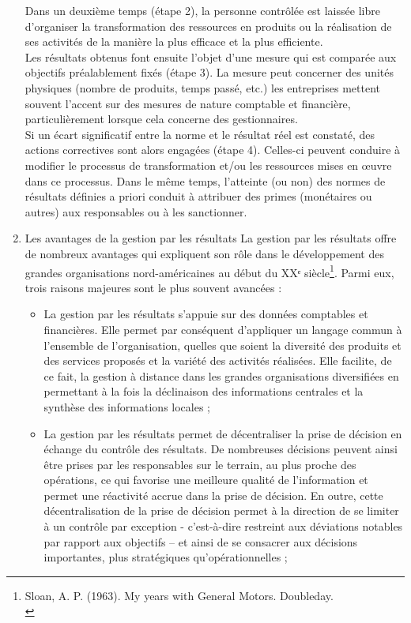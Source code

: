 \documentclass{tufte-handout}
\begin{document}
\begin{enumerate}
 Dans un deuxième temps (étape 2), la personne contrôlée est laissée libre d’organiser la transformation des ressources en produits ou la réalisation de ses activités de la manière la plus efficace et la plus efficiente.\\
Les résultats obtenus font ensuite l’objet d’une mesure qui est comparée aux objectifs préalablement fixés (étape 3). La mesure peut concerner des unités physiques (nombre de produits, temps passé, etc.) les entreprises mettent souvent l’accent sur des mesures de nature comptable et financière, particulièrement lorsque cela concerne des gestionnaires.\\
Si un écart significatif entre la norme et le résultat réel est constaté, des actions correctives sont alors engagées (étape 4). Celles-ci peuvent conduire à modifier le processus de transformation et/ou les ressources mises en œuvre dans ce processus. Dans le même temps, l’atteinte (ou non) des normes de résultats définies a priori conduit à attribuer des primes (monétaires ou autres) aux responsables ou à les sanctionner.\\
\item Les avantages de la gestion par les résultats
\label{sec:orgd37593c}
La gestion par les résultats offre de nombreux avantages qui expliquent son rôle dans le développement des grandes organisations nord-américaines au début du XXᵉ siècle\footnote{Sloan, A. P. (1963). My years with General Motors. Doubleday.\\}. Parmi eux, trois raisons majeures sont le plus souvent avancées :\\
\begin{itemize}
\item La gestion par les résultats s’appuie sur des données comptables et financières. Elle permet par conséquent d’appliquer un langage commun à l’ensemble de l’organisation, quelles que soient la diversité des produits et des services proposés et la variété des activités réalisées. Elle facilite, de ce fait, la gestion à distance dans les grandes organisations diversifiées en permettant à la fois la déclinaison des informations centrales et la synthèse des informations locales ;\\
\item La gestion par les résultats permet de décentraliser la prise de décision en échange du contrôle des résultats. De nombreuses décisions peuvent ainsi être prises par les responsables sur le terrain, au plus proche des opérations, ce qui favorise une meilleure qualité de l’information et permet une réactivité accrue dans la prise de décision. En outre, cette décentralisation de la prise de décision permet à la direction de se limiter à un contrôle par exception - c’est-à-dire restreint aux déviations notables par rapport aux objectifs – et ainsi de se consacrer aux décisions importantes, plus stratégiques qu’opérationnelles ;\\

\end{itemize}
\end{enumerate}
\end{document}
